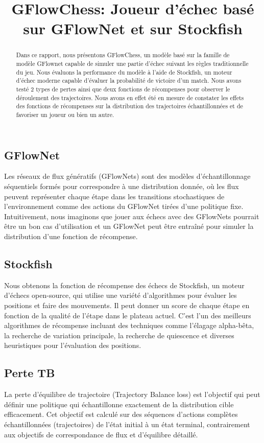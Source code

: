 \documentclass[11pt]{article}
\title{GFlowChess: Joueur d'échec basé sur GFlowNet et sur Stockfish}
\author[1]{\nameemail{Yizhan Li}{yizhan.li@umontreal.ca}}
\author[1]{\nameemail{Olivier
    Déry-Prévost}{olivier.dery-prevost@umontreal.ca}}
\author[1]{\nameemail{Sidya Galakho}{sidya.galakho@umontreal.ca}}
\author[1]{\nameemail{Simon Théorêt}{simon.theoret.1@umontreal.ca}}
\affil[1]{Université de Montréal}
\begin{document}
\maketitle


\begin{abstract}
	Dans ce rapport, nous présentons GFlowChess, un modèle basé sur la
	famille de modèle GFlownet capable de simuler une partie d'échec
	suivant les règles traditionnelle du jeu. Nous évaluons la
	performance du modèle à l'aide de Stockfish, un moteur d'échec
	moderne capable d'évaluer la probabilité de victoire d'un
	match. Nous avons testé 2 types de pertes ainsi que deux fonctions
	de récompenses pour observer le déroulement des trajectoires. Nous
	avons en effet été en mesure de constater les effets des fonctions
	de récompenses sur la distribution des trajectoires échantillonnées
	et de favoriser un joueur ou bien un autre.
\end{abstract}

\subsection{GFlowNet}
Les réseaux de flux génératifs (GFlowNets) sont des modèles
d'échantillonnage séquentiels formés pour correspondre à une
distribution donnée, où les flux peuvent représenter chaque étape dans
les transitions stochastiques de l'environnement comme des actions du
GFlowNet tirées d'une politique fixe. Intuitivement, nous imaginons
que jouer aux échecs avec des GFlowNets pourrait être un bon cas
d'utilisation et un GFlowNet peut être entraîné pour simuler la
distribution d'une fonction de récompense.

\subsection{Stockfish}
Nous obtenons la fonction de récompense des échecs de Stockfish, un
moteur d'échecs open-source, qui utilise une variété d'algorithmes
pour évaluer les positions et faire des mouvements. Il peut donner un
score de chaque étape en fonction de la qualité de l'étape dans le
plateau actuel. C'est l'un des meilleurs algorithmes de récompense
incluant des techniques comme l'élagage alpha-bêta, la recherche de
variation principale, la recherche de quiescence et diverses
heuristiques pour l'évaluation des positions.

\subsection{Perte TB}
La perte d'équilibre de trajectoire (Trajectory Balance loss) est
l'objectif qui peut définir une politique qui échantillonne exactement
de la distribution cible efficacement. Cet objectif est calculé sur
des séquences d'actions complètes échantillonnées (trajectoires) de
l'état initial à un état terminal, contrairement aux objectifs de
correspondance de flux et d'équilibre détaillé.
\\
\end{document}
